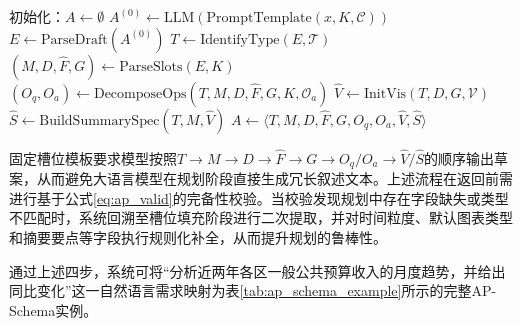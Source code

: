 \begin{algorithm}[htbp]
	    初始化：$A \leftarrow \emptyset$\;
	    $A^{(0)} \leftarrow \text{LLM}(\text{PromptTemplate}(x, K, \mathcal{C}))$ 
	    $E \leftarrow \text{ParseDraft}(A^{(0)})$ 
	    $T \leftarrow \text{IdentifyType}(E, \mathcal{T})$
	    $(M, D, \hat{F}, G) \leftarrow \text{ParseSlots}(E, K)$
	    $(O_q, O_a) \leftarrow \text{DecomposeOps}(T, M, D, \hat{F}, G, K, \mathcal{O}_a)$
	    $\hat{V} \leftarrow \text{InitVis}(T, D, G, \mathcal{V})$
    $\hat{S} \leftarrow \text{BuildSummarySpec}(T, M, \hat{V})$
    $A \leftarrow \langle T, M, D, \hat{F}, G, O_q, O_a, \hat{V}, \hat{S} \rangle$\;
	    \caption{AP-Schema构建算法}\label{alg:analysis_planning}
	    \end{algorithm}


固定槽位模板要求模型按照$T \rightarrow M \rightarrow D \rightarrow \hat{F} \rightarrow G \rightarrow O_q/O_a \rightarrow \hat{V}/\hat{S}$的顺序输出草案，从而避免大语言模型在规划阶段直接生成冗长叙述文本。上述流程在返回前需进行基于公式\eqref{eq:ap_valid}的完备性校验。当校验发现规划中存在字段缺失或类型不匹配时，系统回溯至槽位填充阶段进行二次提取，并对时间粒度、默认图表类型和摘要要点等字段执行规则化补全，从而提升规划的鲁棒性。

通过上述四步，系统可将“分析近两年各区一般公共预算收入的月度趋势，并给出同比变化”这一自然语言需求映射为表\ref{tab:ap_schema_example}所示的完整AP-Schema实例。

